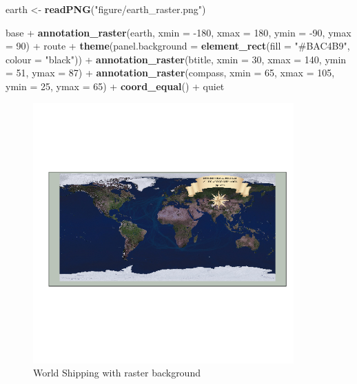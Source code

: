 \documentclass[]{article}
\newenvironment{Shaded}{}{}
\newcommand{\KeywordTok}[1]{\textcolor[rgb]{0.00,0.44,0.13}{\textbf{{#1}}}}
\newcommand{\DataTypeTok}[1]{\textcolor[rgb]{0.56,0.13,0.00}{{#1}}}
\newcommand{\DecValTok}[1]{\textcolor[rgb]{0.25,0.63,0.44}{{#1}}}
\newcommand{\StringTok}[1]{\textcolor[rgb]{0.25,0.44,0.63}{{#1}}}
\newcommand{\NormalTok}[1]{{#1}}
\let\Oldincludegraphics\includegraphics
\renewcommand{\includegraphics}[1]{\Oldincludegraphics[width=10cm]{#1}}
\begin{document}
\begin{Shaded}
\begin{Highlighting}[]
\NormalTok{earth <- }\KeywordTok{readPNG}\NormalTok{(}\StringTok{"figure/earth_raster.png"}\NormalTok{)}

\NormalTok{base + }\KeywordTok{annotation_raster}\NormalTok{(earth, }\DataTypeTok{xmin =} \NormalTok{-}\DecValTok{180}\NormalTok{, }\DataTypeTok{xmax =} \DecValTok{180}\NormalTok{, }\DataTypeTok{ymin =} \NormalTok{-}\DecValTok{90}\NormalTok{, }\DataTypeTok{ymax =} \DecValTok{90}\NormalTok{) + }
    \NormalTok{route + }\KeywordTok{theme}\NormalTok{(}\DataTypeTok{panel.background =} \KeywordTok{element_rect}\NormalTok{(}\DataTypeTok{fill =} \StringTok{"#BAC4B9"}\NormalTok{, }\DataTypeTok{colour =} \StringTok{"black"}\NormalTok{)) + }
    \KeywordTok{annotation_raster}\NormalTok{(btitle, }\DataTypeTok{xmin =} \DecValTok{30}\NormalTok{, }\DataTypeTok{xmax =} \DecValTok{140}\NormalTok{, }\DataTypeTok{ymin =} \DecValTok{51}\NormalTok{, }\DataTypeTok{ymax =} \DecValTok{87}\NormalTok{) + }
    \KeywordTok{annotation_raster}\NormalTok{(compass, }\DataTypeTok{xmin =} \DecValTok{65}\NormalTok{, }\DataTypeTok{xmax =} \DecValTok{105}\NormalTok{, }\DataTypeTok{ymin =} \DecValTok{25}\NormalTok{, }\DataTypeTok{ymax =} \DecValTok{65}\NormalTok{) + }
    \KeywordTok{coord_equal}\NormalTok{() + quiet}
\end{Highlighting}
\end{Shaded}

\begin{figure}[htbp]
\centering
\includegraphics{figure/World_Shipping_with_raster_background.png}
\caption{World Shipping with raster background}
\end{figure}
\end{document}
